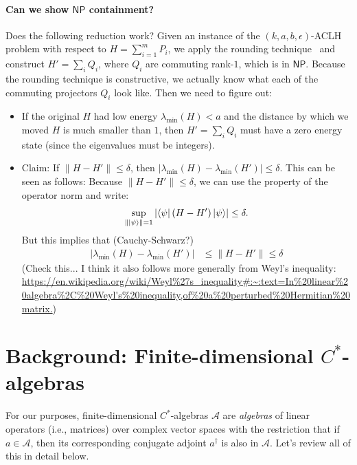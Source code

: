 \documentclass[12pt]{article}
\theoremstyle{plain}
\begin{document}
\paragraph{Can we show $\mathsf{NP}$ containment?}
Does the following reduction work? Given an instance of the $(k,a,b,\epsilon)$-ACLH problem with respect to $H= \sum_{i=1}^m P_i$, we apply the rounding technique~\cite[Theorem 3.2]{https://doi.org/10.4230/lipics.itcs.2017.48} and construct $H'=\sum_i Q_i$, where $Q_i$ are commuting rank-$1$, which is in $\mathsf{NP}$. Because the rounding technique is constructive, we actually know what each of the commuting projectors $Q_i$ look like. Then we need to figure out:
\begin{itemize}
    \item If the original $H$ had low energy $\lambda_{\mathrm{min}}(H) < a$ and the distance by which we moved $H$ is much smaller than $1$, then $H'=\sum_i Q_i$ must have a zero energy state (since the eigenvalues must be integers).

    \item Claim: If $\|H - H'\| \leq \delta$, then $|\lambda_{\mathrm{min}}(H) -\lambda_{\mathrm{min}}(H')| \leq \delta$. This can be seen as follows: Because $\|H - H'\| \leq \delta$, we can use the property of the operator norm and write:
$$
\sup_{\| \ket{\psi}\|=1} \left|\bra{\psi} (H - H') \ket{\psi}\right| \leq \delta.
$$
But this implies that (Cauchy-Schwarz?)
\begin{align*}
|\lambda_{\mathrm{min}}(H) -\lambda_{\mathrm{min}}(H')| 
&\leq \|H - H'\| \leq \delta
\end{align*}
(Check this... I think it also follows more generally from Weyl's inequality: \url{https://en.wikipedia.org/wiki/Weyl%27s_inequality#:~:text=In%20linear%20algebra%2C%20Weyl's%20inequality,of%20a%20perturbed%20Hermitian%20matrix.})
\end{itemize}


\newpage

\section{Background: Finite-dimensional $C^*$-algebras}

For our purposes, finite-dimensional $C^*$-algebras $\mathcal{A}$ are \emph{algebras} of linear operators (i.e., matrices) over complex vector spaces with the restriction that if $a \in \mathcal{A}$, then its corresponding conjugate adjoint $a^\dag$ is also in $\mathcal{A}$. Let's review all of this in detail below. 
\end{document}
